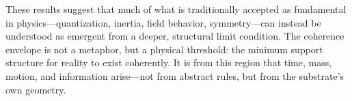 \documentclass[entropy,article,submit,pdftex,oneauthor]{Definitions/mdpi}
\begin{document}
These results suggest that much of what is traditionally accepted as fundamental in physics—quantization, inertia, field behavior, symmetry—can instead be understood as emergent from a deeper, structural limit condition. The coherence envelope is not a metaphor, but a physical threshold: the minimum support structure for reality to exist coherently. It is from this region that time, mass, motion, and information arise—not from abstract rules, but from the substrate’s own geometry.

\vspace{6pt} 




\end{document}
